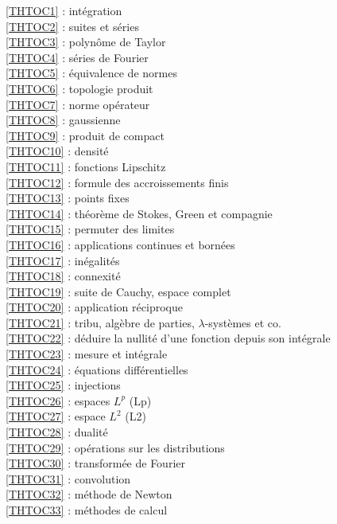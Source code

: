 \ref {THTOC1} : intégration\\
\ref {THTOC2} : suites et séries\\
\ref {THTOC3} : polynôme de Taylor\\
\ref {THTOC4} : séries de Fourier\\
\ref {THTOC5} : équivalence de normes\\
\ref {THTOC6} : topologie produit\\
\ref {THTOC7} : norme opérateur\\
\ref {THTOC8} : gaussienne\\
\ref {THTOC9} : produit de compact\\
\ref {THTOC10} : densité\\
\ref {THTOC11} : fonctions Lipschitz\\
\ref {THTOC12} : formule des accroissements finis\\
\ref {THTOC13} : points fixes\\
\ref {THTOC14} : théorème de Stokes, Green et compagnie\\
\ref {THTOC15} : permuter des limites\\
\ref {THTOC16} : applications continues et bornées\\
\ref {THTOC17} : inégalités\\
\ref {THTOC18} : connexité\\
\ref {THTOC19} : suite de Cauchy, espace complet\\
\ref {THTOC20} : application réciproque\\
\ref {THTOC21} : tribu, algèbre de parties, \( \lambda \)-systèmes et co.\\
\ref {THTOC22} : déduire la nullité d'une fonction depuis son intégrale\\
\ref {THTOC23} : mesure et intégrale\\
\ref {THTOC24} : équations différentielles\\
\ref {THTOC25} : injections\\
\ref {THTOC26} : espaces \( L^p\) (Lp)\\
\ref {THTOC27} : espace \( L^2\) (L2)\\
\ref {THTOC28} : dualité\\
\ref {THTOC29} : opérations sur les distributions\\
\ref {THTOC30} : transformée de Fourier\\
\ref {THTOC31} : convolution\\
\ref {THTOC32} : méthode de Newton\\
\ref {THTOC33} : méthodes de calcul\\
